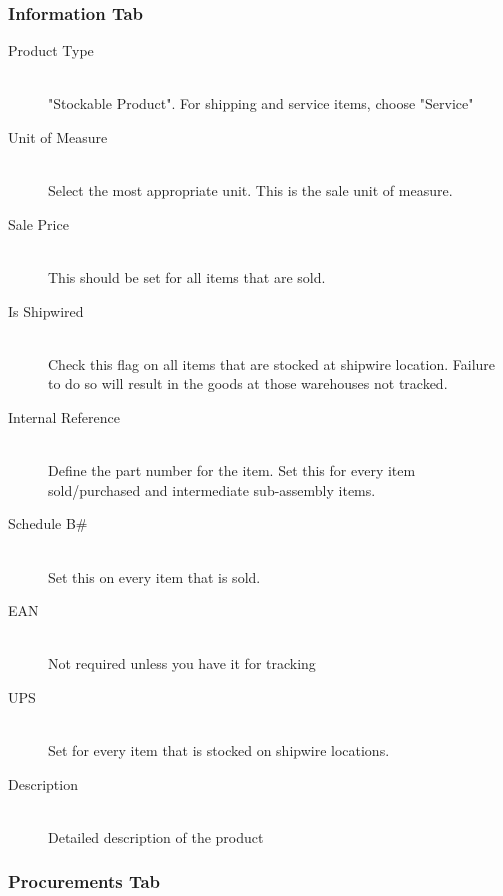 \subsubsection{Information Tab}

\begin{description}
\item[Product Type] \hfill \\
"Stockable Product". For shipping and service items, choose "Service"
\item[Unit of Measure] \hfill \\
Select the most appropriate unit. This is the sale unit of measure. 
\item[Sale Price] \hfill \\
This should be set for all items that are sold.
\item[Is Shipwired] \hfill \\
Check this flag on all items that are stocked at shipwire location. Failure to do so will result in the goods at those warehouses not tracked.
\item[Internal Reference] \hfill \\
Define the part number for the item. Set this for every item sold/purchased and intermediate sub-assembly items.
\item[Schedule B\#] \hfill \\
Set this on every item that is sold.
\item[EAN] \hfill \\
Not required unless you have it for tracking
\item[UPS] \hfill \\
Set for every item that is stocked on shipwire locations.
\item[Description] \hfill \\
Detailed description of the product
\end{description}

\subsubsection{Procurements Tab}

